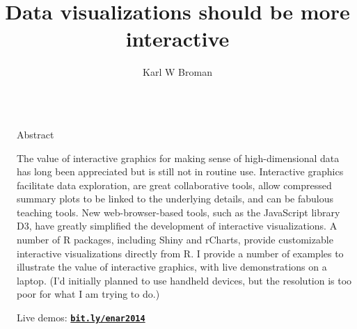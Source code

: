 \documentclass[final,plain]{beamer}
\title{Data visualizations should be more interactive}
\author{Karl W Broman}
\institute{\normalsize Biostatistics \&
  Medical Informatics, University of Wisconsin--Madison}
\newlength{\sepwid}
\newlength{\onecolwid}
\newcommand{\bi}{\begin{itemize}}
\newcommand{\ei}{\end{itemize}}
\newcommand{\bluebold}{\color{dblue} \bf}
\newcommand{\colonevsep}{\vspace{40mm}}
\begin{document}
\begin{frame}[t]

\begin{columns}[t]
  \begin{column}{\sepwid}\end{column} %

  \begin{column}{\onecolwid}

    \begin{exampleblock}{\Large Abstract}
       {The value of interactive graphics for making sense of
        high-dimensional data has long been appreciated but is still not
        in routine use. Interactive graphics facilitate data exploration,
        are great collaborative tools, allow compressed summary plots to
        be linked to the underlying details, and can be fabulous teaching
        tools. New web-browser-based tools, such as the JavaScript library
        D3, have greatly simplified the development of interactive
        visualizations. A number of R packages, including Shiny and
        rCharts, provide customizable interactive visualizations directly
        from R.  I provide a number of examples to illustrate the
        value of interactive graphics, with live demonstrations on a
        laptop. (I'd initially planned to use
        handheld devices, but the resolution is too poor for what I am
        trying to do.)

     \vspace{18pt}

        \centerline{Live demos:
        \href{http://www.biostat.wisc.edu/~kbroman/posters/ENAR2014}{\tt \textbf{bit.ly/enar2014}}}

     }

    \end{exampleblock}


  \colonevsep %

\end{column}
\end{columns}
\end{frame}
\end{document}
